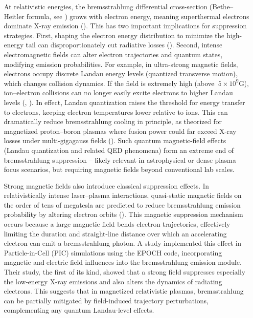 \documentclass[12pt]{article}
\begin{document}
At relativistic energies, the bremsstrahlung differential cross-section (Bethe–Heitler formula, see \cite{Bethe-Heitler}) grows with electron energy, meaning superthermal electrons dominate X-ray emission (\cite{SuppressionBremsstrahlung}). This has two important implications for suppression strategies. First, shaping the electron energy distribution to minimize the high-energy tail can disproportionately cut radiative losses (\cite{SuppressionBremsstrahlung}). Second, intense electromagnetic fields can alter electron trajectories and quantum states, modifying emission probabilities. For example, in ultra-strong magnetic fields, electrons occupy discrete Landau energy levels (quantized transverse motion), which changes collision dynamics. If the field is extremely high (above $~5×10^9$G), ion–electron collisions can no longer easily excite electrons to higher Landau levels (\cite{SuppressionBremsstrahlung}, \cite{ProspectsP11B}). In effect, Landau quantization raises the threshold for energy transfer to electrons, keeping electron temperatures lower relative to ions. This can dramatically reduce bremsstrahlung cooling in principle, as theorized for magnetized proton–boron plasmas where fusion power could far exceed X-ray losses under multi-gigagauss fields (\cite{ProspectsP11B}). Such quantum magnetic-field effects (Landau quantization and related QED phenomena) form an extreme end of bremsstrahlung suppression – likely relevant in astrophysical or dense plasma focus scenarios, but requiring magnetic fields beyond conventional lab scales.

Strong magnetic fields also introduce classical suppression effects. In relativistically intense laser–plasma interactions, quasi-static magnetic fields on the order of tens of megatesla are predicted to reduce bremsstrahlung emission probability by altering electron orbits (\cite{10.1063/5.0167288}). This magnetic suppression mechanism occurs because a large magnetic field bends electron trajectories, effectively limiting the duration and straight-line distance over which an accelerating electron can emit a bremsstrahlung photon. A study implemented this effect in Particle-in-Cell (PIC) simulations using the EPOCH code, incorporating magnetic and electric field influences into the bremsstrahlung emission module. Their study, the first of its kind, showed that a strong field suppresses especially the low-energy X-ray emissions and also alters the dynamics of radiating electrons. This suggests that in magnetized relativistic plasmas, bremsstrahlung can be partially mitigated by field-induced trajectory perturbations, complementing any quantum Landau-level effects.
\end{document}
